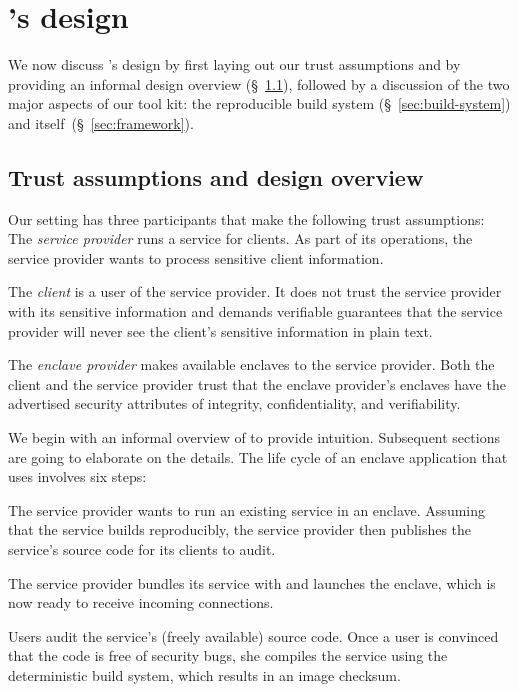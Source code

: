 \section{\Tool{}'s design}%
\label{sec:design}

We now discuss \tool{}'s design by first laying out our trust assumptions and by
providing an informal design overview (\S~\ref{sec:assumptions-overview}),
followed by a discussion of the two major aspects of our tool kit: the
reproducible build system (\S~\ref{sec:build-system}) and \tool{}
itself~(\S~\ref{sec:framework}).

\subsection{Trust assumptions and design overview}%
\label{sec:assumptions-overview}

Our setting has three participants that make the following trust assumptions:
%
The \emph{service provider} runs a service for clients.  As part of its
operations, the service provider wants to process sensitive client information.

The \emph{client} is a user of the service provider.  It does not trust the
service provider with its sensitive information and demands verifiable
guarantees that the service provider will never see the client's sensitive
information in plain text.

The \emph{enclave provider} makes available enclaves to the service provider.
Both the client and the service provider trust that the enclave provider's
enclaves have the advertised security attributes of integrity, confidentiality,
and verifiability.

We begin with an informal overview of \tool{} to provide intuition.  Subsequent
sections are going to elaborate on the details.  The life cycle of an enclave
application that uses \tool{} involves six steps:

 The service provider wants to run an existing service in an enclave.
Assuming that the service builds reproducibly, the service provider then
publishes the service's source code for its clients to audit.

 The service provider bundles its service with \tool{} and launches
the enclave, which is now ready to receive incoming connections.

 Users audit the service's (freely available) source code.  Once a
user is convinced that the code is free of security bugs, she compiles the
service using the deterministic build system, which results in an image
checksum.

